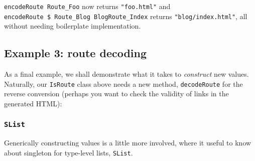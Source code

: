 \texttt{encodeRoute\ Route\_Foo} now returns \texttt{"foo.html"} and
\texttt{encodeRoute\ \$\ Route\_Blog\ BlogRoute\_Index} returns
\texttt{"blog/index.html"}, all without needing boilerplate
implementation.

\hypertarget{example-3-route-decoding}{%
\subsection{Example 3: route decoding}\label{example-3-route-decoding}}

As a final example, we shall demonstrate what it takes to
\emph{construct} new values. Naturally, our \texttt{IsRoute} class above
needs a new method, \texttt{decodeRoute} for the reverse conversion
(perhaps you want to check the validity of links in the generated HTML):

\begin{Shaded}
\begin{Highlighting}[]
 
\OtherTok{{-}\textgreater{}} 
  \OtherTok{{-}\textgreater{}} 

 \NormalTok{ (} \NormalTok{ (}\OtherTok{=\textgreater{}}  \OtherTok{{-}\textgreater{}} 
\OtherTok{=} 
\end{Highlighting}
\end{Shaded}

\hypertarget{slist}{%
\subsubsection{\texorpdfstring{\texttt{SList}}{SList}}\label{slist}}

Generically constructing values is a little more involved, where it
useful to know about singleton for type-level lists, \texttt{SList}.

